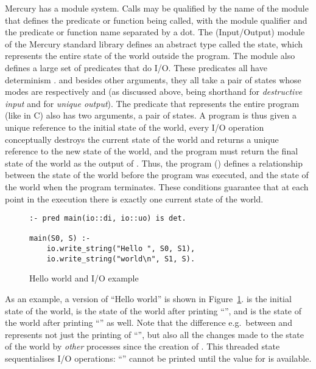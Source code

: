 Mercury has a module system.
Calls may be qualified by the name of the module
that defines the predicate or function being called,
with the module qualifier and the predicate or function name
separated by a dot.
The \io (Input/Output) module of the Mercury standard library
defines an abstract type called the \io state,
which represents the entire state of the world outside the program.
The \io module also defines a large set of predicates that do I/O.
These predicates all have determinism \ddet.
and besides other arguments,
they all take a pair of \io states
whose modes are respectively \di and \uo
(as discussed above, \di being shorthand for \emph{destructive input}
and \uo for \emph{unique output}).
The  predicate that represents the entire program
(like  in C)
also has two arguments, a  pair of \io states.
A program is thus given
a unique reference to the initial state of the world,
every I/O operation conceptually destroys the current state of the world
and returns a unique reference to the new state of the world,
and the program must return the final state of the world
as the output of .
Thus, the program () defines a relationship between the state
of the world before the program was executed,
and the state of the world when the program terminates.
These conditions guarantee that at each point in the execution
there is exactly one current state of the world.

\begin{figure}
\begin{verbatim}
:- pred main(io::di, io::uo) is det.

main(S0, S) :-
    io.write_string("Hello ", S0, S1),
    io.write_string("world\n", S1, S).
\end{verbatim}
\caption{Hello world and I/O example}
\label{fig:hello}
\end{figure}

As an example, a version of ``Hello world'' is shown in
Figure~\ref{fig:hello}.
 is the initial state of the world,
 is the state of the world after printing ``'',
and  is the state of the world
after printing ``'' as well.
Note that the difference e.g.\ between  and 
represents not just the printing of ``'',
but also all the changes made to the state of the world
by \emph{other} processes since the creation of .
This threaded state sequentialises I/O operations:
``'' cannot be printed until the value for 
is available.

